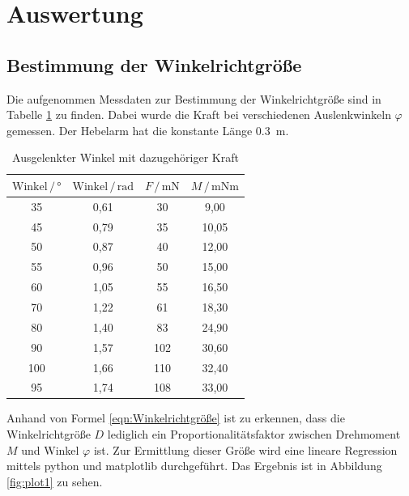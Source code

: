 \section{Auswertung}
\label{sec:Auswertung}

\subsection{Bestimmung der Winkelrichtgröße}

Die aufgenommen Messdaten zur Bestimmung der Winkelrichtgröße sind in Tabelle \ref{tab:Messdaten1}
zu finden. Dabei wurde die Kraft bei verschiedenen Auslenkwinkeln $\varphi$ gemessen. Der Hebelarm
hat die konstante Länge \SI{0.3}{\meter}.

\begin{table}
\centering
\caption{Ausgelenkter Winkel mit dazugehöriger Kraft}
\label{tab:Messdaten1}
\begin{tabular}{c c c c}
\toprule
$\text{Winkel} \,/\, °$ & $\text{Winkel} \,/\, \text{rad}$ & $F \,/\, \si{\milli\newton}$ & $M \,/\, \si{\milli\newton\meter}$\\
\midrule
 35 & 0,61 &  30 &  9,00\\
 45 & 0,79 &  35 & 10,05\\
 50 & 0,87 &  40 & 12,00\\
 55 & 0,96 &  50 & 15,00\\
 60 & 1,05 &  55 & 16,50\\
 70 & 1,22 &  61 & 18,30\\
 80 & 1,40 &  83 & 24,90\\
 90 & 1,57 & 102 & 30,60\\
100 & 1,66 & 110 & 32,40\\
 95 & 1,74 & 108 & 33,00\\
\bottomrule
\end{tabular}
\end{table}

Anhand von Formel \eqref{eqn:Winkelrichtgröße} ist zu erkennen, dass die Winkelrichtgröße $D$ 
lediglich ein Proportionalitätsfaktor zwischen Drehmoment $M$ und Winkel $\varphi$ ist. Zur Ermittlung 
dieser Größe wird eine lineare Regression mittels python und matplotlib durchgeführt. 
Das Ergebnis ist in Abbildung \ref{fig:plot1} zu sehen. 


